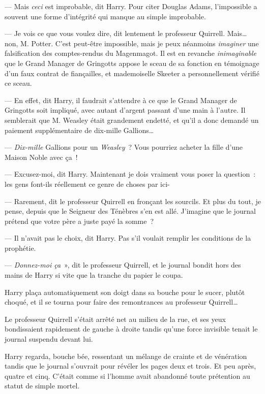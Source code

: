 --- Mais \emph{ceci} est improbable, dit Harry. Pour citer Douglas Adams, l'impossible a souvent une forme d'intégrité qui manque au simple improbable.

--- Je vois ce que vous voulez dire, dit lentement le professeur Quirrell. Mais… non, M. Potter. C'est peut-être impossible, mais je peux néanmoins \emph{imaginer} une falsification des comptes-rendus du Magenmagot. Il est en revanche \emph{inimaginable} que le Grand Manager de Gringotts appose le sceau de sa fonction en témoignage d'un faux contrat de fiançailles, et mademoiselle Skeeter a personnellement vérifié ce sceau.

--- En effet, dit Harry, il faudrait s'attendre à ce que le Grand Manager de Gringotts soit impliqué, avec autant d'argent passant d'une main à l'autre. Il semblerait que M. Weasley était grandement endetté, et qu'il a donc demandé un paiement supplémentaire de dix-mille Gallions…

--- \emph{Dix-mille} Gallions pour un \emph{Weasley}~? Vous pourriez acheter la fille d'une Maison Noble avec ça~!

--- Excusez-moi, dit Harry. Maintenant je dois vraiment vous poser la question~: les gens font-ils réellement ce genre de choses par ici-

--- Rarement, dit le professeur Quirrell en fronçant les sourcils. Et plus du tout, je pense, depuis que le Seigneur des Ténèbres s'en est allé. J'imagine que le journal prétend que votre père a juste payé la somme~?

--- Il n'avait pas le choix, dit Harry. Pas s'il voulait remplir les conditions de la prophétie.

--- \emph{Donnez-moi ça}~», dit le professeur Quirrell, et le journal bondit hors des mains de Harry si vite que la tranche du papier le coupa.

Harry plaça automatiquement son doigt dans sa bouche pour le sucer, plutôt choqué, et il se tourna pour faire des remontrances au professeur Quirrell…

Le professeur Quirrell s'était arrêté net au milieu de la rue, et ses yeux bondissaient rapidement de gauche à droite tandis qu'une force invisible tenait le journal suspendu devant lui.

Harry regarda, bouche bée, ressentant un mélange de crainte et de vénération tandis que le journal s'ouvrait pour révéler les pages deux et trois. Et peu après, quatre et cinq. C'était comme si l'homme avait abandonné toute prétention au statut de simple mortel.

